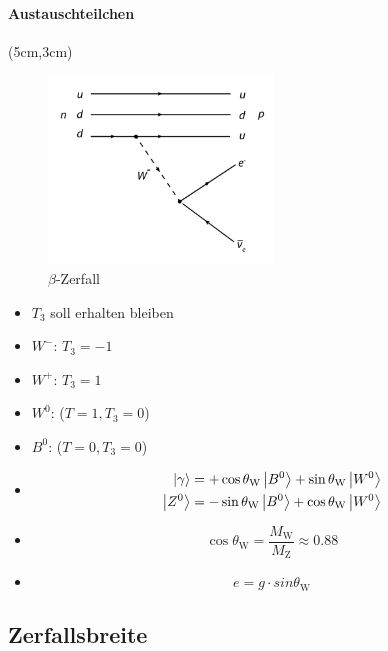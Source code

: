 \begin{iframe}	
	
	
	\framesubtitle{Austauschteilchen}
	\begin{textblock*}{7cm}(5cm,3cm) %
		\begin{figure}
		\includegraphics[height=5cm]{img/betadecay}
		\caption*{$\beta$-Zerfall\cite{beta}}
	\end{figure}
	\end{textblock*}
	\begin{itemize}
		\pause
		\item $T_3$ soll erhalten bleiben
		\pause
		\item $W^-$: $T_3=-1$
		\pause
		\item $W^+$: $T_3=1$
		\pause
		\item $W^0$: ($T=1,T_3=0$)
		\item $B^0$: ($T=0,T_3=0$)
	\end{itemize}
	
\end{iframe}

\begin{iframe}
	\begin{itemize}
	\item
		\begin{align*}
		 \left|\gamma\right\rangle &= +\cos{\theta_\text{W}} \left|B^0\right\rangle + \sin{\theta_\text{W}} \left|W^0\right\rangle	\\
		\left|Z^0\right\rangle &= -\sin{\theta_\text{W}} \left|B^0\right\rangle + \cos{\theta_\text{W}} \left|W^0\right\rangle
		\end{align*}
		\pause
	\item 
		\begin{equation*}
		\cos{\theta_\text{W}}=\frac{M_\text{W}}{M_\text{Z}} \approx 0.88
		\end{equation*}
	\pause
		\item 
		\begin{equation*}
		e = g \cdot sin{\theta_\text{W}}
		\end{equation*}
	\end{itemize}

\end{iframe}

\subsection{Zerfallsbreite}